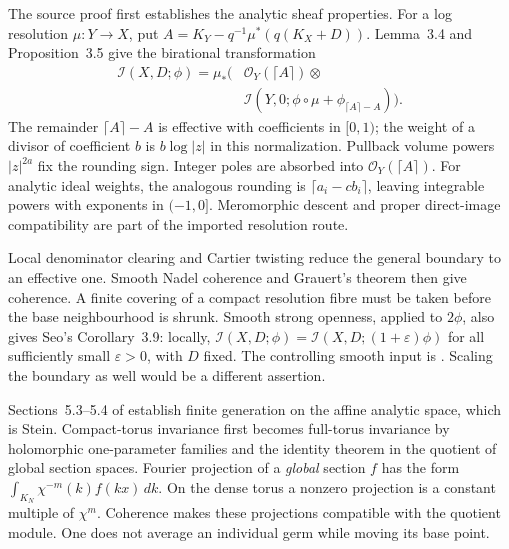The source proof first establishes the analytic sheaf properties.
For a log resolution $\mu:Y\to X$, put
$A=K_Y-q^{-1}\mu^*(q(K_X+D))$. Lemma~3.4 and Proposition~3.5 give
the birational transformation
\begin{equation*}
\begin{aligned}
 \mathcal I(X,D;\phi)
   =\mu_*\bigl(&\mathcal O_Y(\lceil A\rceil)\otimes\\
              &\mathcal I(Y,0;\phi\circ\mu+
                                  \phi_{\lceil A\rceil-A})\bigr).
\end{aligned}
\tag{H.67}\label{eq:appH-toric-birational-module}
\end{equation*}
The remainder $\lceil A\rceil-A$ is effective with coefficients in
$[0,1)$; the weight of a divisor of coefficient $b$ is $b\log|z|$
in this normalization. Pullback volume powers $|z|^{2a}$ fix the
rounding sign. Integer poles are absorbed into
$\mathcal O_Y(\lceil A\rceil)$. For analytic ideal weights, the
analogous rounding is $\lceil a_i-cb_i\rceil$, leaving integrable
powers with exponents in $(-1,0]$. Meromorphic descent and proper
direct-image compatibility are part of the imported resolution route.

Local denominator clearing and Cartier twisting reduce the general
boundary to an effective one. Smooth Nadel coherence and Grauert's
theorem then give coherence. A finite covering of a compact
resolution fibre must be taken before the base neighbourhood is
shrunk. Smooth strong openness, applied to $2\phi$, also gives
Seo's Corollary~3.9: locally,
$\mathcal I(X,D;\phi)=\mathcal I(X,D;(1+\varepsilon)\phi)$
for all sufficiently small $\varepsilon>0$, with $D$ fixed.
The controlling smooth input is
\cite[Theorem~1.1, printed p.~606]{GuanZhou15AnnalsPublished}.
Scaling the boundary as well would be a different assertion.

Sections~5.3--5.4 of \cite{Seo26ToricMultiplierV1} establish finite
generation on the affine analytic space, which is Stein. Compact-torus
invariance first becomes full-torus invariance by holomorphic
one-parameter families and the identity theorem in the quotient of
global section spaces. Fourier projection of a \emph{global} section
$f$ has the form
$\int_{K_N}\chi^{-m}(k)f(kx)\,dk$. On the dense torus a nonzero
projection is a constant multiple of $\chi^m$. Coherence makes these
projections compatible with the quotient module. One does not average
an individual germ while moving its base point.

